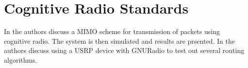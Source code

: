 \section{Cognitive Radio Standards}
In \cite{7124942} the authors discuss a MIMO scheme for transmission of packets using cognitive radio. The system is then simulated and results are prsented. 
In \cite{5784217} the authors discuss using a USRP device with GNURadio to test out several routing algorithms.  

